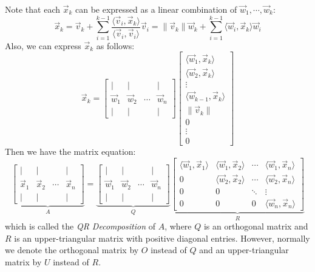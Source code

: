 Note that each $\vec{x}_k$ can be expressed as a linear combination of $\vec{w}_1, \cdots, \vec{w}_k$:
\[
	\vec{x}_k = \vec{v}_k + \sum_{i = 1}^{k - 1} \frac{\langle \vec{v}_i, \vec{x}_k \rangle}{\langle \vec{v}_i, \vec{v}_i \rangle} \vec{v}_i = \| \vec{v}_k \| \vec{w}_k + \sum_{i = 1}^{k - 1} \langle \vec{w}_i, \vec{x}_k \rangle \vec{w}_i
\]
Also, we can express $\vec{x}_k$ as follows:
\[
	\vec{x}_k = \begin{bmatrix}
		|         & |         &        & |         \\
		\vec{w}_1 & \vec{w}_2 & \cdots & \vec{w}_n \\
		|         & |         &        & |
	\end{bmatrix} \begin{bmatrix}
		\langle \vec{w}_1, \vec{x}_k \rangle       \\
		\langle \vec{w}_2, \vec{x}_k \rangle       \\
		\vdots                                     \\
		\langle \vec{w}_{k - 1}, \vec{x}_k \rangle \\
		\| \vec{v}_k \|                            \\
		0                                          \\
		\vdots                                     \\
		0
	\end{bmatrix}
\]
Then we have the matrix equation:
\[
	\underbrace{\begin{bmatrix}
			|         & |         &        & |         \\
			\vec{x}_1 & \vec{x}_2 & \cdots & \vec{x}_n \\
			|         & |         &        & |
		\end{bmatrix}}_{A} = \underbrace{\begin{bmatrix}
			|         & |         &        & |         \\
			\vec{w}_1 & \vec{w}_2 & \cdots & \vec{w}_n \\
			|         & |         &        & |
		\end{bmatrix}}_{Q} \underbrace{\begin{bmatrix}
			\langle \vec{w}_1, \vec{x}_1 \rangle & \langle \vec{w}_1, \vec{x}_2 \rangle & \cdots & \langle \vec{w}_1, \vec{x}_n \rangle \\
			0                                    & \langle \vec{w}_2, \vec{x}_2 \rangle & \cdots & \langle \vec{w}_2, \vec{x}_n \rangle \\
			0                                    & 0                                    & \ddots & \vdots                               \\
			0                                    & 0                                    & 0      & \langle \vec{w}_n, \vec{x}_n \rangle
		\end{bmatrix}}_{R}
\]
which is called the \emph{QR Decomposition} of $A$, where $Q$ is an orthogonal matrix and $R$ is an upper-triangular matrix with positive diagonal entries. However, normally we denote the orthogonal matrix by $O$ instead of $Q$ and an upper-triangular matrix by $U$ instead of $R$.

